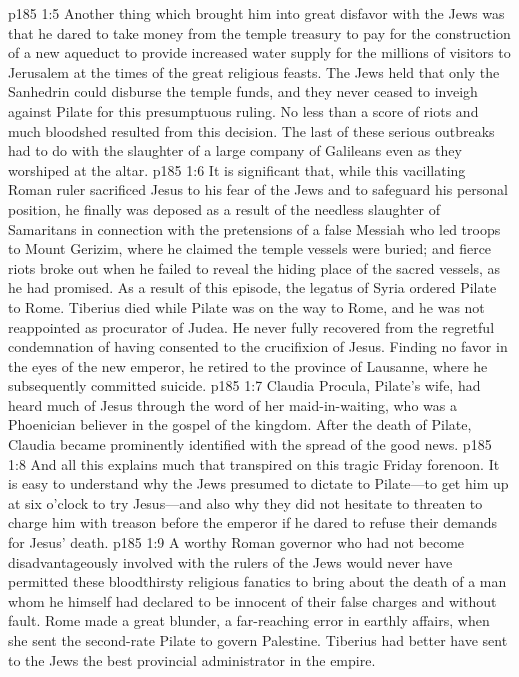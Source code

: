 \pc \vs p185 1:5 Another thing which brought him into great disfavor with the Jews was that he dared to take money from the temple treasury to pay for the construction of a new aqueduct to provide increased water supply for the millions of visitors to Jerusalem at the times of the great religious feasts. The Jews held that only the Sanhedrin could disburse the temple funds, and they never ceased to inveigh against Pilate for this presumptuous ruling. No less than a score of riots and much bloodshed resulted from this decision. The last of these serious outbreaks had to do with the slaughter of a large company of Galileans even as they worshiped at the altar.
\pc \vs p185 1:6 It is significant that, while this vacillating Roman ruler sacrificed Jesus to his fear of the Jews and to safeguard his personal position, he finally was deposed as a result of the needless slaughter of Samaritans in connection with the pretensions of a false Messiah who led troops to Mount Gerizim, where he claimed the temple vessels were buried; and fierce riots broke out when he failed to reveal the hiding place of the sacred vessels, as he had promised. As a result of this episode, the legatus of Syria ordered Pilate to Rome. Tiberius died while Pilate was on the way to Rome, and he was not reappointed as procurator of Judea. He never fully recovered from the regretful condemnation of having consented to the crucifixion of Jesus. Finding no favor in the eyes of the new emperor, he retired to the province of Lausanne, where he subsequently committed suicide.
\pc \vs p185 1:7 Claudia Procula, Pilate’s wife, had heard much of Jesus through the word of her maid\hyp{}in\hyp{}waiting, who was a Phoenician believer in the gospel of the kingdom. After the death of Pilate, Claudia became prominently identified with the spread of the good news.
\pc \vs p185 1:8 And all this explains much that transpired on this tragic Friday forenoon. It is easy to understand why the Jews presumed to dictate to Pilate---to get him up at six o’clock to try Jesus---and also why they did not hesitate to threaten to charge him with treason before the emperor if he dared to refuse their demands for Jesus’ death.
\vs p185 1:9 A worthy Roman governor who had not become disadvantageously involved with the rulers of the Jews would never have permitted these bloodthirsty religious fanatics to bring about the death of a man whom he himself had declared to be innocent of their false charges and without fault. Rome made a great blunder, a far\hyp{}reaching error in earthly affairs, when she sent the second\hyp{}rate Pilate to govern Palestine. Tiberius had better have sent to the Jews the best provincial administrator in the empire.
